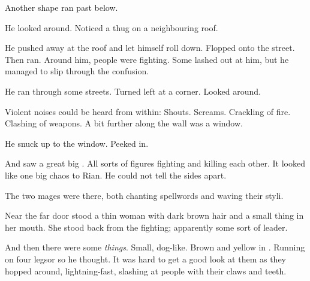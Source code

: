 Another shape ran past below. 


He looked around. 
Noticed a thug on a neighbouring roof. 

He pushed away at the roof and let himself roll down. 
Flopped onto the street. 
Then ran. 
Around him, people were fighting. 
Some lashed out at him, but he managed to slip through the confusion. 

He ran through some streets. 
Turned left at a corner. 
Looked around. 

Violent noises could be heard from within: 
Shouts.
Screams.
Crackling of fire.
Clashing of weapons. 
A bit further along the wall was a window. 

He snuck up to the window. 
Peeked in. 

\begin{comment}
\subsection{Rian sees mages die}
\end{comment}

And saw a great big \melee. 
All sorts of figures fighting and killing each other. 
It looked like one big chaos to Rian. 
He could not tell the sides apart. 

The two mages were there, both chanting spellwords and waving their styli. 

Near the far door stood a thin woman with dark brown hair and a small thing in her mouth.
She stood back from the fighting; apparently some sort of leader. 

And then there were some \emph{things}. 
Small, dog-like. 
Brown and yellow in \colour. 
Running on four legs\prikker or so he thought. 
It was hard to get a good look at them as they hopped around, lightning-fast, slashing at people with their claws and teeth. 

